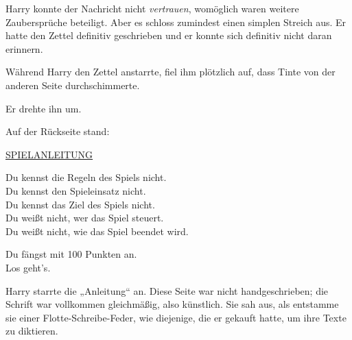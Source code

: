 Harry konnte der Nachricht nicht \emph{vertrauen}, womöglich waren weitere Zaubersprüche beteiligt. Aber es schloss zumindest einen simplen Streich aus. Er hatte den Zettel definitiv geschrieben und er konnte sich definitiv nicht daran erinnern.

Während Harry den Zettel anstarrte, fiel ihm plötzlich auf, dass Tinte von der anderen Seite durchschimmerte.

Er drehte ihn um.

Auf der Rückseite stand:

\begin{writtenNote}\centering
\textsc{\underline{\uppercase{Spielanleitung}}}



Du kennst die Regeln des Spiels nicht.\\
Du kennst den Spieleinsatz nicht.\\
Du kennst das Ziel des Spiels nicht.\\
Du weißt nicht, wer das Spiel steuert.\\
Du weißt nicht, wie das Spiel beendet wird.

Du fängst mit 100 Punkten an.\\
Los geht’s.
\end{writtenNote}

Harry starrte die „Anleitung“ an. Diese Seite war nicht handgeschrieben; die Schrift war vollkommen gleichmäßig, also künstlich. Sie sah aus, als entstamme sie einer Flotte-Schreibe-Feder, wie diejenige, die er gekauft hatte, um ihre Texte zu diktieren.

